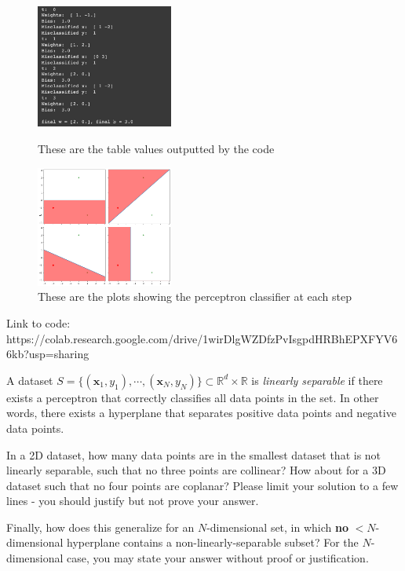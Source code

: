 \begin{solution}
  \begin{figure}[H]
    \centering
    \includegraphics[width=0.4\textwidth]{images/4_ouput.jpg}
    \caption{These are the table values outputted by the code}
    \label{fig:figure1}
    
    \centering
    \includegraphics[width=0.4\textwidth]{images/4_output2.png}
    \caption{These are the plots showing the perceptron classifier at each step}
    \label{fig:figure1}
  \end{figure}
Link to code: https://colab.research.google.com/drive/1wirDlgWZDfzPvIsgpdHRBhEPXFYV66kb?usp=sharing
\end{solution}

\begin{problem}[4]
  A dataset $S = \{(\mathbf{x}_1, y_1),\cdots,(\mathbf{x}_N, y_N)\} \subset \mathbb{R}^d \times \mathbb{R}$ is \emph{linearly separable} if there exists a perceptron that correctly classifies all data points in the set. In other words, there exists a hyperplane that separates positive data points and negative data points.

  In a 2D dataset, how many data points are in the smallest dataset that is not linearly separable, such that no three points are collinear? How about for a 3D dataset such that no four points are coplanar? Please limit your solution to a few lines - you should justify but not prove your answer.

  Finally, how does this generalize for an $N$-dimensional set, in which \textbf{no} $<$$N$-dimensional hyperplane contains a non-linearly-separable subset? For the $N$-dimensional case, you may state your answer without proof or justification.
\end{problem}

